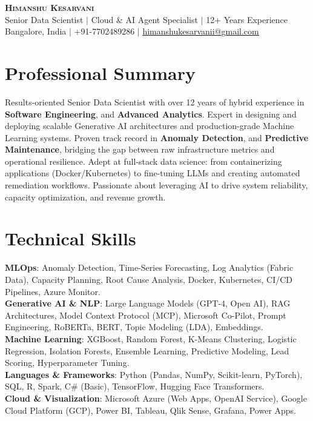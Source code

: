 \documentclass[letterpaper,10pt]{article}
\begin{document}
\begin{center}
    \textbf{\Huge \scshape Himanshu Kesarvani} \\ \vspace{6pt}
    \small Senior Data Scientist $\vert$ Cloud \& AI Agent Specialist $\vert$ 12+ Years Experience \\
    \small Bangalore, India $\vert$ +91-7702489286 $\vert$ \href{mailto:himanshukesarvanii@gmail.com}{\underline{himanshukesarvanii@gmail.com}}
\end{center}


\section{Professional Summary}
Results-oriented Senior Data Scientist with over 12 years of hybrid experience in \textbf{Software Engineering}, and \textbf{Advanced Analytics}. Expert in designing and deploying scalable Generative AI architectures and production-grade Machine Learning systems. Proven track record in \textbf{Anomaly Detection}, and \textbf{Predictive Maintenance}, bridging the gap between raw infrastructure metrics and operational resilience. Adept at full-stack data science: from containerizing applications (Docker/Kubernetes) to fine-tuning LLMs and creating automated remediation workflows. Passionate about leveraging AI to drive system reliability, capacity optimization, and revenue growth.


\section{Technical Skills}
\begin{itemize}[leftmargin=0.15in, label={}]
    \small{\item{
     \textbf{MLOps}{: Anomaly Detection, Time-Series Forecasting, Log Analytics (Fabric Data), Capacity Planning, Root Cause Analysis, Docker, Kubernetes, CI/CD Pipelines, Azure Monitor.} \\ \vspace{3pt}
     \textbf{Generative AI \& NLP}{: Large Language Models (GPT-4, Open AI), RAG Architectures, Model Context Protocol (MCP), Microsoft Co-Pilot, Prompt Engineering, RoBERTa, BERT, Topic Modeling (LDA), Embeddings.} \\ \vspace{3pt}
     \textbf{Machine Learning}{: XGBoost, Random Forest, K-Means Clustering, Logistic Regression, Isolation Forests, Ensemble Learning, Predictive Modeling, Lead Scoring, Hyperparameter Tuning.} \\ \vspace{3pt}
     \textbf{Languages \& Frameworks}{: Python (Pandas, NumPy, Scikit-learn, PyTorch), SQL, R, Spark, C\# (Basic), TensorFlow, Hugging Face Transformers.} \\ \vspace{3pt}
     \textbf{Cloud \& Visualization}{: Microsoft Azure (Web Apps, OpenAI Service), Google Cloud Platform (GCP), Power BI, Tableau, Qlik Sense, Grafana, Power Apps.}
    }}
\end{itemize}
\end{document}
